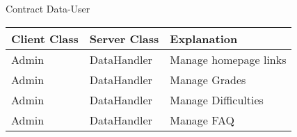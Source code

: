 \begin{subsubsection}{Contract Data-User}
	\begin{tabular}{l l l }
	  Client Class & Server Class & Explanation\\ \hline
	  Admin & DataHandler & Manage homepage links\\
		Admin & DataHandler & Manage Grades\\
		Admin & DataHandler & Manage Difficulties\\
		Admin & DataHandler & Manage FAQ
	\end{tabular}
\end{subsubsection}
